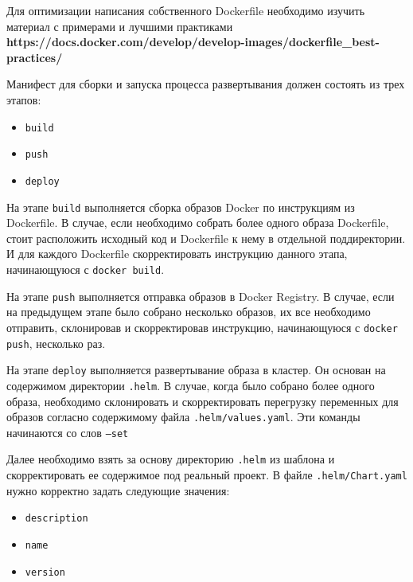 Для оптимизации написания собственного Dockerfile необходимо изучить материал с примерами и лучшими практиками \textbf{https://docs.docker.com/develop/develop-images/dockerfile\_best-practices/}

Манифест для сборки и запуска процесса развертывания должен состоять из трех этапов:
\begin{itemize}
    \item \texttt{build}
    \item \texttt{push}
    \item \texttt{deploy}
\end{itemize}

На этапе \texttt{build} выполняется сборка образов Docker по инструкциям из Dockerfile. В случае, если необходимо собрать более одного образа Dockerfile, стоит расположить исходный код и Dockerfile к нему в отдельной поддиректории. И для каждого Dockerfile скорректировать инструкцию данного этапа, начинающуюся с \texttt{docker build}.

На этапе \texttt{push} выполняется отправка образов в Docker Registry. В случае, если на предыдущем этапе было собрано несколько образов, их все необходимо отправить, склонировав и скорректировав инструкцию, начинающуюся с \texttt{docker push}, несколько раз.

На этапе \texttt{deploy} выполняется развертывание образа в кластер. Он основан на содержимом директории \texttt{.helm}. В случае, когда было собрано более одного образа, необходимо склонировать и скорректировать перегрузку переменных для образов согласно содержимому файла \texttt{.helm/values.yaml}. Эти команды начинаются со слов \texttt{--set}

Далее необходимо взять за основу директорию \texttt{.helm} из шаблона и скорректировать ее содержимое под реальный проект. В файле \texttt{.helm/Chart.yaml} нужно корректно задать следующие значения:
\begin{itemize}
    \item \texttt{description}
    \item \texttt{name}
    \item \texttt{version}
\end{itemize}

